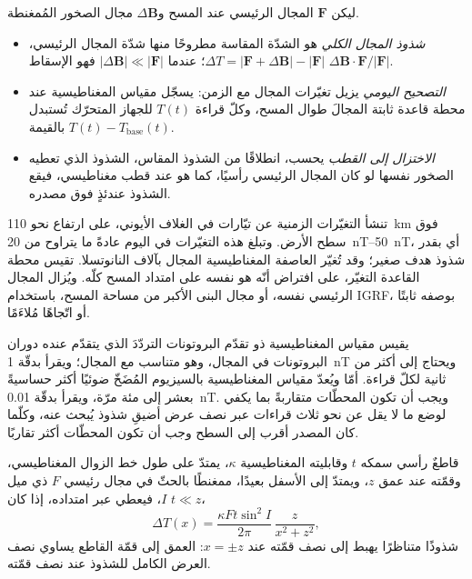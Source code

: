 \begin{definition}\label{def:b3:field-lab-methods-3:magnetic}
ليكن $\mathbf{F}$ المجال الرئيسي عند المسح و$\Delta\mathbf{B}$
مجال الصخور المُمغنطة.
  \begin{itemize}
  \item \emph{شذوذ المجال الكلي} هو
        الشدّة المقاسة مطروحًا منها شدّة المجال الرئيسي، $\Delta T =
        |\mathbf{F} + \Delta\mathbf{B}| - |\mathbf{F}|$؛ عندما
        $|\Delta\mathbf{B}| \ll |\mathbf{F}|$ فهو الإسقاط
        $\Delta\mathbf{B}\cdot\mathbf{F}/|\mathbf{F}|$.
  \item \emph{التصحيح اليومي} يزيل
        تغيّرات المجال مع الزمن: يسجّل مقياس المغناطيسية عند محطة قاعدة
        ثابتة المجالَ طوال المسح، وكلّ
        قراءة $T(t)$ للجهاز المتحرّك تُستبدل بالقيمة $T(t) -
        T_\mathrm{base}(t)$.
  \item \emph{الاختزال إلى القطب}
        يحسب، انطلاقًا من الشذوذ المقاس، الشذوذ الذي تعطيه الصخور نفسها
        لو كان المجال الرئيسي رأسيًا، كما هو عند قطب مغناطيسي،
        فيقع الشذوذ عندئذٍ فوق مصدره.
  \end{itemize}
\end{definition}

تنشأ التغيّرات الزمنية عن تيّارات في الغلاف الأيوني، على ارتفاع نحو
\qty{110}{km} فوق سطح الأرض. وتبلغ هذه التغيّرات في اليوم عادةً ما يتراوح
من \qtyrange{20}{50}{nT}، أي بقدر شذوذ هدف صغير؛ وقد تُغيّر العاصفة
المغناطيسية المجال بآلاف النانوتسلا.
تقيس محطة القاعدة التغيّر، على افتراض أنّه
هو نفسه على امتداد المسح كلّه. ويُزال المجال الرئيسي نفسه، أو مجال
البنى الأكبر من مساحة المسح، باستخدام IGRF، بوصفه ثابتًا
أو اتّجاهًا مُلاءَمًا.

يقيس مقياس المغناطيسية ذو تقدّم البروتونات التردّدَ الذي يتقدّم عنده
دوران البروتونات في المجال، وهو متناسب مع المجال؛ ويقرأ بدقّة
\qty{1}{nT} ويحتاج إلى أكثر من ثانية لكلّ قراءة. أمّا
ويُعدّ مقياس المغناطيسية بالسيزيوم المُضَخّ ضوئيًا أكثر حساسيةً بعشر
إلى مئة مرّة، ويقرأ بدقّة \qty{0.01}{nT}. ويجب أن تكون المحطّات
متقاربةً بما يكفي لوضع ما لا يقل عن نحو ثلاث قراءات عبر نصف عرض
أضيقِ شذوذ يُبحث عنه، وكلّما كان المصدر أقرب إلى السطح وجب أن تكون
المحطّات أكثر تقاربًا.

\begin{proposition}\label{prop:b3:field-lab-methods-3:dyke}
قاطعٌ رأسي سمكه $t$ وقابليته المغناطيسية $\kappa$، يمتدّ
على طول خط الزوال المغناطيسي، وقمّته عند عمق $z$، ويمتدّ
إلى الأسفل بعيدًا، ممغنطًا بالحثّ في مجال رئيسي $F$ ذي ميل $I$،
فيعطي عبر امتداده، إذا كان $t \ll z$،
\[
\Delta T(x) = \frac{\kappa F t\sin^2 I}{2\pi}\,\frac{z}{x^2 + z^2} ,
\]
شذوذًا متناظرًا يهبط إلى نصف قمّته عند $x = \pm z$: العمق
إلى قمّة القاطع يساوي نصف العرض الكامل للشذوذ عند
نصف قمّته.
\end{proposition}

